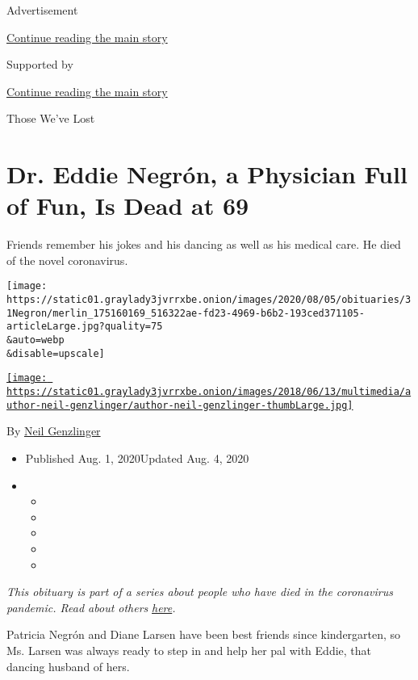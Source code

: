 Advertisement

\protect\hyperlink{after-top}{Continue reading the main story}

Supported by

\protect\hyperlink{after-sponsor}{Continue reading the main story}

Those We've Lost

\hypertarget{dr-eddie-negruxf3n-a-physician-full-of-fun-is-dead-at-69}{%
\section{Dr. Eddie Negrón, a Physician Full of Fun, Is Dead at
69}\label{dr-eddie-negruxf3n-a-physician-full-of-fun-is-dead-at-69}}

Friends remember his jokes and his dancing as well as his medical care.
He died of the novel coronavirus.

\texttt{[image: https://static01.graylady3jvrrxbe.onion/images/2020/08/05/obituaries/31Negron/merlin\_175160169\_516322ae-fd23-4969-b6b2-193ced371105-articleLarge.jpg?quality=75\\\&auto=webp\\\&disable=upscale]}

\href{https://www.nytimes3xbfgragh.onion/by/neil-genzlinger}{\texttt{[image: https://static01.graylady3jvrrxbe.onion/images/2018/06/13/multimedia/author-neil-genzlinger/author-neil-genzlinger-thumbLarge.jpg]}}

By \href{https://www.nytimes3xbfgragh.onion/by/neil-genzlinger}{Neil
Genzlinger}

\begin{itemize}
\item
  Published Aug. 1, 2020Updated Aug. 4, 2020
\item
  \begin{itemize}
  \item
  \item
  \item
  \item
  \item
  \end{itemize}
\end{itemize}

\emph{This obituary is part of a series about people who have died in
the coronavirus pandemic. Read about others}
\href{https://www.nytimes3xbfgragh.onion/interactive/2020/obituaries/people-died-coronavirus-obituaries.html}{\emph{here}}\emph{.}

Patricia Negrón and Diane Larsen have been best friends since
kindergarten, so Ms. Larsen was always ready to step in and help her pal
with Eddie, that dancing husband of hers.

